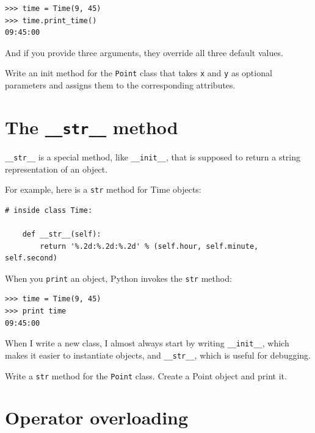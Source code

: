 \documentclass[10pt]{book}
\begin{document}
{\beforeverb
\begin{verbatim}
>>> time = Time(9, 45)
>>> time.print_time()
09:45:00
\end{verbatim}
\afterverb
%
And if you provide three arguments, they override all three
default values.


\begin{ex}

Write an init method for the {\tt Point} class that takes
{\tt x} and {\tt y} as optional parameters and assigns
them to the corresponding attributes.
\end{ex}


\section{The {\tt \_\_str\_\_} method}


\verb"__str__" is a special method, like \verb"__init__",
that is supposed to return a string representation of an object.


For example, here is a {\tt str} method for Time objects:

\beforeverb
\begin{verbatim}
# inside class Time:

    def __str__(self):
        return '%.2d:%.2d:%.2d' % (self.hour, self.minute, self.second)
\end{verbatim}
\afterverb
%
When you {\tt print} an object, Python invokes the {\tt str} method:


\beforeverb
\begin{verbatim}
>>> time = Time(9, 45)
>>> print time
09:45:00
\end{verbatim}
\afterverb
%
When I write a new class, I almost always start by writing 
\verb"__init__", which makes it easier to instantiate objects, and 
\verb"__str__", which is useful for debugging.


\begin{ex}
Write a {\tt str} method for the {\tt Point} class.  Create
a Point object and print it.
\end{ex}


\section{Operator overloading}
\label{operator overloading}

}
\end{document}
